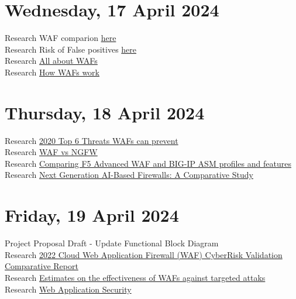 \section[2024/04/17]{Wednesday, 17 April 2024}
Research WAF comparion \href{https://www.peerspot.com/products/comparisons/aws-waf_vs_azure-web-application-firewall}{here}\\
Research Risk of False positives \href{https://www.indusface.com/blog/the-risks-of-false-positives-with-web-application-firewalls/}{here}\\
Research \href{https://avinetworks.com/what-is-a-web-application-firewall/}{All about WAFs}\\
Research \href{https://www.indusface.com/blog/how-web-application-firewall-works/}{How WAFs work}\\
\pendsign

\section[2024/04/18]{Thursday, 18 April 2024}
Research \href{https://avinetworks.com/what-is-a-web-application-firewall/}{2020 Top 6 Threats WAFs can prevent}\\
Research \href{https://www.orangecyberdefense.com/be/blog/waf-vs-ngfw}{WAF vs NGFW}\\
Research \href{https://my.f5.com/manage/s/article/K14231234}{Comparing F5 Advanced WAF and BIG-IP ASM profiles and features}\\
Research \href{https://hal.science/hal-04456265/}{Next Generation AI-Based Firewalls: A Comparative Study}\\
\pendsign

\section[2024/04/19]{Friday, 19 April 2024}
Project Proposal Draft - Update Functional Block Diagram\\
Research \href{https://www.imperva.com/resources/resource-library/reports/2022-cloud-web-application-firewall-waf-cyberrisk-validation-comparative-report/}{2022 Cloud Web Application Firewall (WAF) CyberRisk Validation Comparative Report}\\
Research \href{https://www.emerald.com/insight/content/doi/10.1108/IMCS-11-2012-0064/full/html}{Estimates on the effectiveness of WAFs against targeted attaks}\\
Research \href{http://projects.webappsec.org/f/wasc-wafec-v1.0.pdf}{Web Application Security}\\
\pendsign

